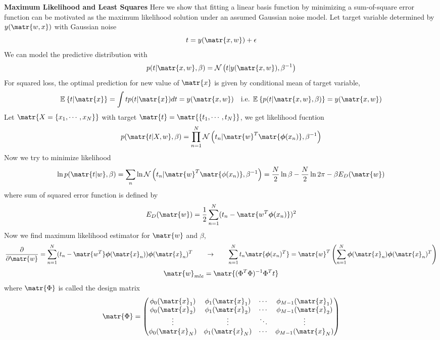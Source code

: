 \documentclass[11pt]{article}
\begin{document}
\begin{defn*}
    \textbf{Maximum Likelihood and Least Squares} Here we show that fitting a linear basis function by minimizing a sum-of-square error function can be motivated as the maximum likelihood solution under an assumed Gaussian noise model. Let target variable determined by $y(\matr{w,x})$ with Gaussian noise
    \[
        t =  y(\matr{x,w}) + \epsilon
    \]
    We can model the predictive distribution with 
    \[
        p(t|\matr{x,w},\beta) = \normal{t|y(\matr{x,w}), \beta^{-1}}
    \]
    For squared loss, the optimal prediction for new value of $\matr{x}$ is given by conditional mean of target variable, 
    \[
        \E{t|\matr{x}} = \int tp(t|\matr{x})dt = y(\matr{x,w})
        \quad \text{i.e. } \E{p(t|\matr{x,w},\beta)} = y(\matr{x,w})
    \]
    Let $\matr{X = \{x_1,\cdots,x_N\}}$ with target $\matr{t} = \matr{\{t_1,\cdots,t_N\}}$, we get likelihood fucntion 
    \[
        p(\matr{t|X,w},\beta) = \prod_{n=1}^N \normal{t_n | \matr{w}^T \matr{\boldsymbol{\phi}(x_n)}, \beta^{-1}}
    \]
    Now we try to minimize likelihood 
    \[
        \ln{p(\matr{t|w},\beta)} 
        = \sum_n \ln{\normal{t_n | \matr{w}^T \matr{\phi(x_n)}, \beta^{-1}}}
        = \frac{N}{2} \ln{\beta} - \frac{N}{2} \ln{2\pi} - \beta E_D(\matr{w})
    \]
    where sum of squared error function is defined by 
    \[
        E_D(\matr{w}) = \frac{1}{2} \sum_{n=1}^N (t_n - \matr{w^T\boldsymbol{\phi}(x_n)})^2
    \]
    Now we find maximum likelihood estimator for $\matr{w}$ and $\beta$,
    \[
        \lebpar{}{\matr{w}} = \sum_{n=1}^N (t_n - \matr{w^T}\boldsymbol{\phi}(\matr{x}_n)) \boldsymbol{\phi}(\matr{x}_n)^T
        \quad \quad \rightarrow \quad \quad 
        \sum_{n=1}^N t_n \matr{\boldsymbol{\phi}(x_n)^T} = \matr{w}^T 
        \left( \sum_{n=1}^N \boldsymbol{\phi}(\matr{x}_n) \boldsymbol{\phi}(\matr{x}_n)^T\right)
    \]
    \[
        \matr{w}_{mle} = \matr{(\Phi^T\Phi)^{-1} \Phi^T t}    
    \]
    where $\matr{\Phi}$ is called the design matrix
    \[
        \matr{\Phi} = 
        \begin{pmatrix}
            \phi_0 (\matr{x}_1) & \phi_1 (\matr{x}_1) & \cdots & \phi_{M-1} (\matr{x}_1) \\
            \phi_0 (\matr{x}_2) & \phi_1 (\matr{x}_2) & \cdots & \phi_{M-1} (\matr{x}_2) \\
            \vdots & \vdots & \ddots & \vdots \\
            \phi_0 (\matr{x}_N) & \phi_1 (\matr{x}_N) & \cdots & \phi_{M-1} (\matr{x}_N) \\
        \end{pmatrix}    
    \]
\end{defn*}
\end{document}
